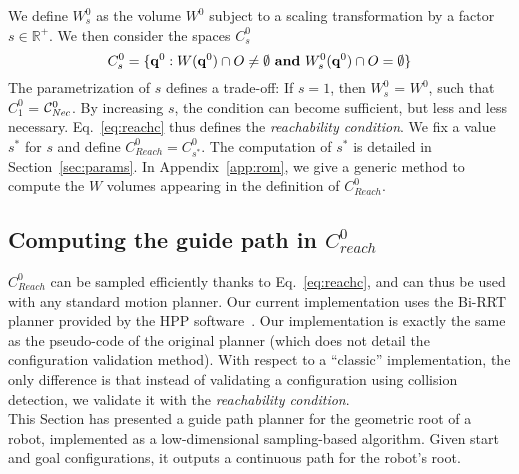 We define $W^0_s$ as the volume $W^0$ subject to a scaling transformation by a factor $s \in \mathbb{R}^+$.
%
We then consider the spaces $C_{s}^0$
 \begin{equation}
 \label{eq:reachc}
C^0_s = \{ \mathbf{q}^0 : W(\mathbf{q}^{0}) \cap O \neq \emptyset \textrm{ \textbf{and}}\ W^0_s(\mathbf{q}^{0}) \cap O = \emptyset \} %
\end{equation}
%
The parametrization of $s$ defines a trade-off:
If $s=1$, then $W^0_s$ = $W^0$, such that $C_1^0$ = $\mathcal{C}^0_{\textrm{\it Nec}}$.
By increasing $s$, the condition can become sufficient, but less and less necessary.  
Eq.~\ref{eq:reachc} thus defines the \textit{reachability condition}. We fix a value $s^*$ for $s$ and define  $C_{Reach}^0 = C^0_{s^*}$.
The computation of $s^*$ is detailed in Section~\ref{sec:params}. 
In Appendix~\ref{app:rom}, we give a generic method to compute the $W$ volumes appearing in the definition of $C_{Reach}^0$.

\subsection{Computing the guide path in $C_{reach}^0$}
$C_{Reach}^0$ can be sampled efficiently thanks to Eq.~\ref{eq:reachc}, and can thus be used with any standard motion planner.
Our current implementation uses the Bi-RRT planner \citep{770022} provided by the HPP software~\citep{7759083}.
Our implementation is exactly the same as the pseudo-code of the original planner (which does not detail the configuration validation method). With respect to a ``classic'' implementation, the only difference is that instead of validating a configuration using collision detection, we validate it with the \textit{reachability condition}.\\


This Section has presented a guide path planner for the geometric root of a robot, implemented as a low-dimensional sampling-based 
algorithm. Given start and goal configurations, it outputs a continuous path for the robot's root. 
